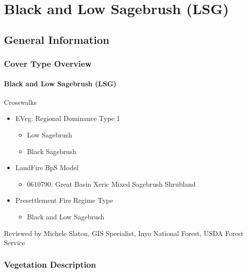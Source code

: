 \newpage
\section{Black and Low Sagebrush (LSG)}
\label{lsg-description}

\subsection*{General Information}

\subsubsection{Cover Type Overview}

\paragraph{Black and Low Sagebrush (LSG)}

Crosswalks
\begin{itemize}
	\item EVeg: Regional Dominance Type 1
	\begin{itemize}
		\item Low Sagebrush
		\item Black Sagebrush
	\end{itemize}

	\item LandFire BpS Model
	\begin{itemize}
		\item 0610790: Great Basin Xeric Mixed Sagebrush Shrubland
	\end{itemize}

	\item Presettlement Fire Regime Type
	\begin{itemize}
		\item Black and Low Sagebrush
	\end{itemize}
\end{itemize}

Reviewed by Michele Slaton, GIS Specialist, Inyo National Forest, USDA Forest Service

\subsubsection{Vegetation Description}
